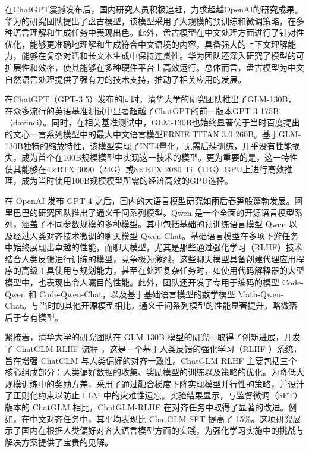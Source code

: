 在ChatGPT震撼发布后，国内研究人员积极追赶，力求超越OpenAI的研究成果。华为的研究团队提出了盘古模型\cite{zeng2021pangualphalargescaleautoregressivepretrained, wang2023pangupienhancinglanguagemodel, ren2023pangusigmatrillionparameterlanguage}，该模型采用了大规模的预训练和微调策略，在多种语言理解和生成任务中表现出色。此外，盘古模型在中文处理方面进行了针对性优化，能够更准确地理解和生成符合中文语境的内容，具备强大的上下文理解能力，能够在复杂对话和长文本生成中保持连贯性。华为团队还深入研究了模型的可扩展性和效率，使其能够在多种硬件平台上高效运行。总体而言，盘古模型为中文自然语言处理提供了强有力的技术支持，推动了相关应用的发展。

在ChatGPT（GPT-3.5）发布的同时，清华大学的研究团队推出了GLM-130B\cite{zeng2023glm130bopenbilingualpretrained}，在众多流行的英语基准测试中显著超越了ChatGPT的前一版本GPT-3 175B（davinci）。同时，在相关基准测试中，GLM-130B也始终显著优于当时百度提出的文心一言系列模型中的最大中文语言模型ERNIE TITAN 3.0 260B。基于GLM-130B独特的缩放特性，该模型实现了INT4量化，无需后续训练，几乎没有性能损失，成为首个在100B规模模型中实现这一技术的模型。更为重要的是，这一特性使其能够在4×RTX 3090（24G）或8×RTX 2080 Ti（11G）GPU上进行高效推理，成为当时使用100B规模模型所需的经济高效的GPU选择。

在 OpenAI 发布 GPT-4 之后，国内的大语言模型研究如雨后春笋般蓬勃发展。阿里巴巴的研究团队推出了通义千问系列模型\cite{bai2023qwentechnicalreport}。Qwen 是一个全面的开源语言模型系列，涵盖了不同参数规模的多种模型。其中包括基础的预训练语言模型 Qwen 以及经过人类对齐技术微调的聊天模型 Qwen-Chat。基础语言模型在多项下游任务中始终展现出卓越的性能，而聊天模型，尤其是那些通过强化学习（RLHF）技术结合人类反馈进行训练的模型，竞争极为激烈。这些聊天模型具备创建代理应用程序的高级工具使用与规划能力，甚至在处理复杂任务时，如使用代码解释器的大型模型中，也表现出令人瞩目的性能。此外，团队还开发了专用于编码的模型 Code-Qwen 和 Code-Qwen-Chat，以及基于基础语言模型的数学模型 Math-Qwen-Chat。与当时的其他开源模型相比，通义千问系列模型的性能显著提升，略微落后于专有模型。

紧接着，清华大学的研究团队在 GLM-130B 模型的研究中取得了创新进展，开发了 ChatGLM-RLHF 流程 \cite{hou2024chatglmrlhfpracticesaligninglarge}，这是一个基于人类反馈的强化学习（RLHF \cite{kaufmann2024surveyreinforcementlearninghuman}）系统，旨在增强 ChatGLM 与人类偏好的对齐一致性。ChatGLM-RLHF 主要包括三个核心组成部分：人类偏好数据的收集、奖励模型的训练以及策略的优化。为降低大规模训练中的奖励方差，采用了通过融合梯度下降实现模型并行性的策略，并设计了正则化约束以防止 LLM 中的灾难性遗忘。实验结果显示，与监督微调（SFT）版本的 ChatGLM 相比，ChatGLM-RLHF 在对齐任务中取得了显著的改进。例如，在中文对齐任务中，其平均表现比 ChatGLM-SFT 提高了 15\%。这项研究展示了国内在根据人类偏好对齐大语言模型方面的实践，为强化学习实施中的挑战与解决方案提供了宝贵的见解。

